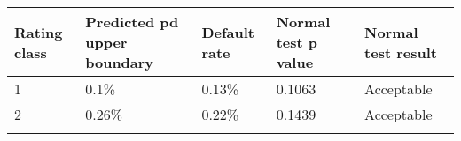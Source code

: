 \begin{longtable}[]{@{}lllll@{}}
\toprule
\begin{minipage}[b]{0.12\columnwidth}\raggedright
Rating class\strut
\end{minipage} & \begin{minipage}[b]{0.26\columnwidth}\raggedright
Predicted pd upper boundary\strut
\end{minipage} & \begin{minipage}[b]{0.12\columnwidth}\raggedright
Default rate\strut
\end{minipage} & \begin{minipage}[b]{0.19\columnwidth}\raggedright
Normal test p value\strut
\end{minipage} & \begin{minipage}[b]{0.18\columnwidth}\raggedright
Normal test result\strut
\end{minipage}\tabularnewline
\midrule
\endhead
\begin{minipage}[t]{0.12\columnwidth}\raggedright
1\strut
\end{minipage} & \begin{minipage}[t]{0.26\columnwidth}\raggedright
0.1\%\strut
\end{minipage} & \begin{minipage}[t]{0.12\columnwidth}\raggedright
0.13\%\strut
\end{minipage} & \begin{minipage}[t]{0.19\columnwidth}\raggedright
0.1063\strut
\end{minipage} & \begin{minipage}[t]{0.18\columnwidth}\raggedright
Acceptable\strut
\end{minipage}\tabularnewline
\begin{minipage}[t]{0.12\columnwidth}\raggedright
2\strut
\end{minipage} & \begin{minipage}[t]{0.26\columnwidth}\raggedright
0.26\%\strut
\end{minipage} & \begin{minipage}[t]{0.12\columnwidth}\raggedright
0.22\%\strut
\end{minipage} & \begin{minipage}[t]{0.19\columnwidth}\raggedright
0.1439\strut
\end{minipage} & \begin{minipage}[t]{0.18\columnwidth}\raggedright
Acceptable\strut
\end{minipage}\tabularnewline
\begin{minipage}[t]{0.12\columnwidth}\raggedright

\end{minipage}
\end{longtable}
